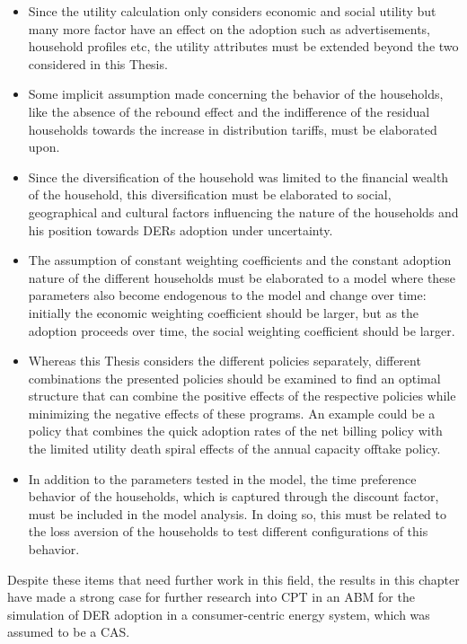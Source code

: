 \begin{itemize}
\item Since the utility calculation only considers economic and social utility but many more factor have an effect on the adoption such as advertisements, household profiles etc, the utility attributes must be extended beyond the two considered in this Thesis.
\item Some implicit assumption made concerning the behavior of the households, like the absence of the rebound effect and the indifference of the residual households towards the increase in distribution tariffs, must be elaborated upon. 
\item Since the diversification of the household was limited to the financial wealth of the household, this diversification must be elaborated to social, geographical and cultural factors influencing the nature of the households and his position towards DERs adoption under uncertainty.
\item The assumption of constant weighting coefficients and the constant adoption nature of the different households must be elaborated to a model where these parameters also become endogenous to the model and change over time: initially the economic weighting coefficient should be larger, but as the adoption proceeds over time, the social weighting coefficient should be larger.
\item Whereas this Thesis considers the different policies separately, different combinations the presented policies should be examined to find an optimal structure that can combine the positive effects of the respective policies while minimizing the negative effects of these programs. An example could be a policy that combines the quick adoption rates of the net billing policy with the limited utility death spiral effects of the annual capacity offtake policy. 
\item In addition to the parameters tested in the model, the time preference behavior of the households, which is captured through the discount factor, must be included in the model analysis. In doing so, this must be related to the loss aversion of the households to test different configurations of this behavior. 
\end{itemize}
Despite these items that need further work in this field, the results in this chapter have made a strong case for further research into CPT in an ABM for the simulation of DER adoption in a consumer-centric energy system, which was assumed to be a CAS. 
